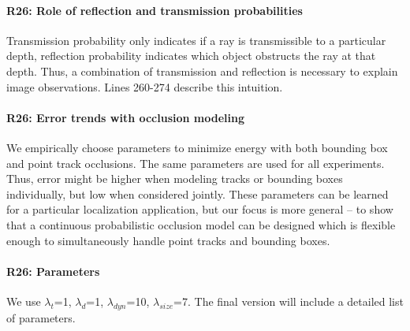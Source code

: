 \documentclass[10pt,twocolumn,letterpaper]{article}
\newcommand{\hili}[1]{\colorbox{yellow}{#1}}
\begin{document}
\vspace{-0.5cm}
\paragraph{R26: Role of reflection and transmission probabilities}
Transmission probability only indicates if a ray is transmissible to a particular depth, reflection probability indicates which object obstructs the ray at that depth. Thus, a combination of transmission and reflection is necessary to explain image observations. Lines 260-274 describe this intuition.


\vspace{-0.5cm}
\paragraph{R26: Error trends with occlusion modeling}
We empirically choose parameters to minimize energy with both bounding box and point track occlusions. The same parameters are used for all experiments. Thus, error might be higher when modeling tracks or bounding boxes individually, but low when considered jointly. These parameters can be learned for a particular localization application, but our focus is more general -- to show that a continuous probabilistic occlusion model can be designed which is flexible enough to simultaneously handle point tracks and bounding boxes.

\vspace{-0.5cm}
\paragraph{R26: Parameters}
We use $\lambda_{t}$=1, $\lambda_{d}$=1, $\lambda_{dyn}$=10, $\lambda_{size}$=7. The final version will include a detailed list of parameters.



\end{document}
